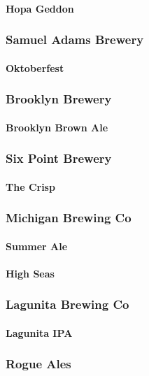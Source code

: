 \documentclass[11pt]{article}
\begin{document}
\paragraph{Hopa Geddon}
\label{sec:org964cd0b}
\subsubsection{Samuel Adams Brewery}
\label{sec:org9edd3fa}
\paragraph{Oktoberfest}
\label{sec:orge6a2c0e}
\subsubsection{Brooklyn Brewery}
\label{sec:orgdf107aa}
\paragraph{Brooklyn Brown Ale}
\label{sec:orgc508618}
\subsubsection{Six Point Brewery}
\label{sec:orga4a7ad9}
\paragraph{The Crisp}
\label{sec:org2cdfe18}
\subsubsection{Michigan Brewing Co}
\label{sec:org0e58b16}
\paragraph{Summer Ale}
\label{sec:orga9b4d25}
\paragraph{High Seas}
\label{sec:org1aea405}
\subsubsection{Lagunita Brewing Co}
\label{sec:org175e9bf}
\paragraph{Lagunita IPA}
\label{sec:org1f2c46d}
\subsubsection{Rogue Ales}
\label{sec:org0a1b271}
\end{document}
